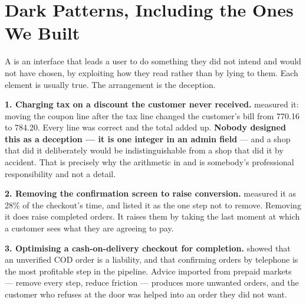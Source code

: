 \section{Dark Patterns, Including the Ones We Built}

\begin{definitionbox}
A  is an interface that leads a user to do something they did
not intend and would not have chosen, by exploiting how they read rather than
by lying to them. Each element is usually true. The arrangement is the
deception.
\end{definitionbox}

\begin{alertbox}
\textbf{1. Charging tax on a discount the customer never received.}
 measured it: moving the coupon line after the tax line
changed the customer's bill from 770.16 to 784.20. Every line was correct and
the total added up. \textbf{Nobody designed this as a deception --- it is one
integer in an admin field} --- and a shop that did it deliberately would be
indistinguishable from a shop that did it by accident. That is precisely why
the arithmetic in  and  is somebody's
professional responsibility and not a detail.

\smallskip
\textbf{2. Removing the confirmation screen to raise conversion.}
 measured it as 28\% of the checkout's time, and listed it as
the one step not to remove. Removing it does raise completed orders. It raises
them by taking the last moment at which a customer sees what they are agreeing
to pay.

\smallskip
\textbf{3. Optimising a cash-on-delivery checkout for completion.}
 showed that an unverified COD order is a liability, and that
confirming orders by telephone is the most profitable step in the pipeline.
Advice imported from prepaid markets --- remove every step, reduce friction ---
produces more unwanted orders, and the customer who refuses at the door was
helped into an order they did not want.
\end{alertbox}

